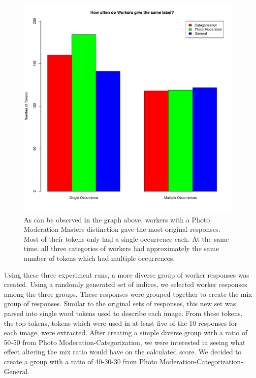 \documentclass{chi2012}
\newcommand{\tab}{\hspace*{2em}}
\begin{document}
 \begin{figure}
\centering
\includegraphics[width=0.9\columnwidth]{extendedAbstractOccurrence}
\caption{As can be observed in the graph above, workers with a Photo Moderation Masters distinction gave the most original responses. Most of their tokens only had a single occurrence each. At the same time, all three categories of workers had approximately the same number of tokens which had multiple occurrences. }
\label{fig:figure1}
\end{figure}
 
\tab Using these three experiment runs, a more diverse group of worker responses was created. Using a randomly generated set of indices, we selected worker responses among the three groups. These responses were grouped together to create the mix group of responses. Similar to the original sets of responses, this new set  was parsed into single word tokens used to describe each image. From these tokens, the top tokens, tokens which were used in at least five of the 10 responses for each image, were extracted. 
\tab After creating a simple diverse group with a ratio of 50-50 from Photo Moderation-Categorization, we were interested in seeing what effect altering the mix ratio would have on the calculated score. We decided to create a group with a ratio of 40-30-30 from Photo Moderation-Categorization-General.   
\end{document}

